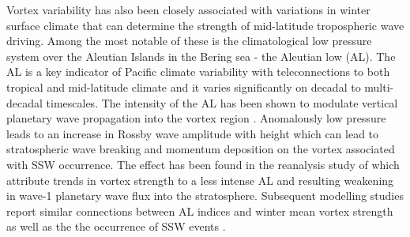 {Vortex variability has also been closely associated with variations in winter surface climate that can determine the strength of mid-latitude tropospheric wave driving. Among the most notable of these is the climatological low pressure system over the Aleutian Islands in the Bering sea - the Aleutian low (AL). The AL is a key indicator of Pacific climate variability with teleconnections to both tropical and mid-latitude climate \citep{Nitta1989, Trenberth1994, Zhang1997} and it varies significantly on decadal to multi-decadal timescales. The intensity of the AL has been shown to modulate vertical planetary wave propagation into the vortex region \citep{Woo2015, Garfinkel2010, manziniInfluence2006}. Anomalously low pressure leads to an increase in Rossby wave amplitude with height \citep{Plumb2003} which can lead to stratospheric wave breaking and momentum deposition on the vortex associated with SSW occurrence. The effect has been found in the reanalysis study of \cite{huDecadal2018} which attribute trends in vortex strength to a less intense AL and resulting weakening in wave-1 planetary wave flux into the stratosphere. Subsequent modelling studies report similar connections between AL indices and winter mean vortex strength as well as the the occurrence of SSW events \citep{krenWintertime2016}. 

}
